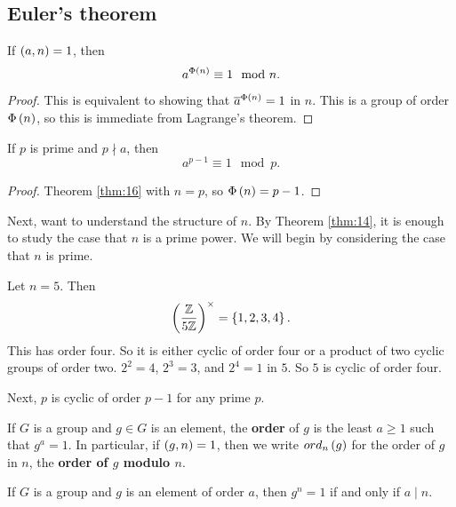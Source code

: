 \subsection{Euler's theorem}

\begin{theorem}
\label{thm:16}
If $ \br{a, n} = 1 $, then
$$ a^{\Phi\br{n}} \equiv 1 \mod n. $$
\end{theorem}

\begin{proof}
This is equivalent to showing that $ \overline{a}^{\Phi\br{n}} = 1 $ in $ \unit{n} $. This is a group of order $ \Phi\br{n} $, so this is immediate from Lagrange's theorem.
\end{proof}

\begin{corollary}
If $ p $ is prime and $ p \nmid a $, then
$$ a^{p - 1} \equiv 1 \mod p. $$
\end{corollary}

\begin{proof}
Theorem \ref{thm:16} with $ n = p $, so $ \Phi\br{n} = p - 1 $.
\end{proof}

Next, want to understand the structure of $ \unit{n} $. By Theorem \ref{thm:14}, it is enough to study the case that $ n $ is a prime power. We will begin by considering the case that $ n $ is prime.

\begin{example*}
Let $ n = 5 $. Then
$$ \Unit{5} = \cbr{1, 2, 3, 4}. $$
This has order four. So it is either cyclic of order four or a product of two cyclic groups of order two. $ 2^2 = 4 $, $ 2^3 = 3 $, and $ 2^4 = 1 $ in $ \unit{5} $. So $ \unit{5} $ is cyclic of order four.
\end{example*}

\pagebreak

Next, $ \unit{p} $ is cyclic of order $ p - 1 $ for any prime $ p $.


\begin{definition}
If $ G $ is a group and $ g \in G $ is an element, the \textbf{order} of $ g $ is the least $ a \ge 1 $ such that $ g^a = 1 $. In particular, if $ \br{g, n} = 1 $, then we write $ ord_n\br{g} $ for the order of $ g $ in $ \unit{n} $, the \textbf{order of $ g $ modulo $ n $}.
\end{definition}

\begin{proposition}
\label{prop:19}
If $ G $ is a group and $ g $ is an element of order $ a $, then $ g^n = 1 $ if and only if $ a \mid n $.
\end{proposition}

